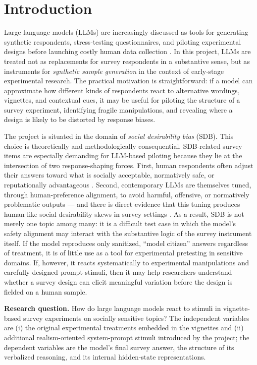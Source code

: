 \documentclass[14pt,a4paper]{extarticle}
\begin{document}
\tableofcontents
\newpage

\section{Introduction}

Large language models (LLMs) are increasingly discussed as tools for generating synthetic respondents, stress-testing questionnaires, and piloting experimental designs before launching costly human data collection \cite{argyle2023, horton2023, dillion2023}. In this project, LLMs are treated not as replacements for survey respondents in a substantive sense, but as instruments for \emph{synthetic sample generation} in the context of early-stage experimental research. The practical motivation is straightforward: if a model can approximate how different kinds of respondents react to alternative wordings, vignettes, and contextual cues, it may be useful for piloting the structure of a survey experiment, identifying fragile manipulations, and revealing where a design is likely to be distorted by response biases.

The project is situated in the domain of \emph{social desirability bias} (SDB). This choice is theoretically and methodologically consequential. SDB-related survey items are especially demanding for LLM-based piloting because they lie at the intersection of two response-shaping forces. First, human respondents often adjust their answers toward what is socially acceptable, normatively safe, or reputationally advantageous \cite{tourangeau2007, krumpal2013}. Second, contemporary LLMs are themselves tuned, through human-preference alignment, to avoid harmful, offensive, or normatively problematic outputs --- and there is direct evidence that this tuning produces human-like social desirability skews in survey settings \cite{salecha2024, sharma2023}. As a result, SDB is not merely one topic among many: it is a difficult test case in which the model's safety alignment may interact with the substantive logic of the survey instrument itself. If the model reproduces only sanitized, ``model citizen'' answers regardless of treatment, it is of little use as a tool for experimental pretesting in sensitive domains. If, however, it reacts systematically to experimental manipulations and carefully designed prompt stimuli, then it may help researchers understand whether a survey design can elicit meaningful variation before the design is fielded on a human sample.

\textbf{Research question.} How do large language models react to stimuli in vignette-based survey experiments on socially sensitive topics? The independent variables are (i) the original experimental treatments embedded in the vignettes and (ii) additional realism-oriented system-prompt stimuli introduced by the project; the dependent variables are the model's final survey answer, the structure of its verbalized reasoning, and its internal hidden-state representations.
\end{document}
